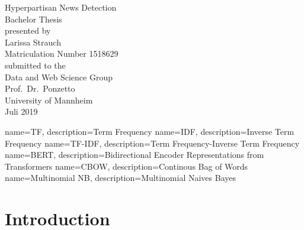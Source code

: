 \documentclass[a4paper, 11pt,titlepage,oneside,openany]{book}
\begin{document}
\begin{titlepage}
	\vspace*{2cm}
  \begin{center}
   {\Large Hyperpartisan News Detection\\}
   \vspace{2cm} 
   {Bachelor Thesis\\}
   \vspace{2cm}
   {presented by\\
    Larissa Strauch \\
    Matriculation Number 1518629\\
   }
   \vspace{1cm} 
   {submitted to the\\
    Data and Web Science Group\\
    Prof.\ Dr.\ Ponzetto\\
    University of Mannheim\\} \vspace{2cm}
   {Juli 2019}
  \end{center}
\end{titlepage} 

\tableofcontents
\newpage

\listofalgorithms
\listofcodes

\listoffigures

\listoftables

{
	name=TF,
	description={Term Frequency}
}
{
	name=IDF,
	description={Inverse Term Frequency}
}
{
	name=TF-IDF,
	description={Term Frequency-Inverse Term Frequency}
}
{
	name=BERT,
	description={Bidirectional Encoder Representations from Transformers}
}
{
	name=CBOW,
	description={Continous Bag of Words}
}
{
	name=Multinomial NB,
	description={Multinomial Naives Bayes}
}


\printglossaries %


\newpage



\chapter{Introduction}
\end{document}
